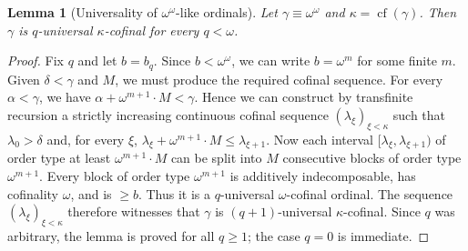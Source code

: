 \documentclass{amsart}
\newcommand{\cf}{\operatorname{cf}}
\newtheorem{lemma}{Lemma}
\theoremstyle{definition}
\begin{document}
\begin{lemma}[Universality of $\omega^\omega$-like ordinals]\label{lem:universal-large}
    Let $\gamma\equiv\omega^\omega$ and $\kappa=\cf(\gamma)$. Then $\gamma$ is $q$-universal $\kappa$-cofinal for every $q<\omega$.
\end{lemma}
\begin{proof}
    Fix $q$ and let $b=b_q$.  Since $b<\omega^\omega$, we can write $b=\omega^m$ for some finite $m$. Given $\delta<\gamma$ and $M$, we must produce the required cofinal sequence. For every $\alpha<\gamma$, we have $\alpha+\omega^{m+1}\cdot M < \gamma$. Hence we can construct by transfinite recursion a strictly increasing continuous cofinal sequence $(\lambda_\xi)_{\xi<\kappa}$ such that $\lambda_0>\delta$ and, for every $\xi$, $\lambda_\xi+\omega^{m+1}\cdot M\leq\lambda_{\xi+1}$. Now each interval $[\lambda_\xi,\lambda_{\xi+1})$ of order type at least $\omega^{m+1}\cdot M$ can be split into $M$ consecutive blocks of order type $\omega^{m+1}$.  Every block of order type $\omega^{m+1}$ is additively indecomposable, has cofinality $\omega$, and is $\ge b$. Thus it is a $q$-universal $\omega$-cofinal ordinal. The sequence $(\lambda_\xi)_{\xi<\kappa}$ therefore witnesses that $\gamma$ is $(q+1)$-universal $\kappa$-cofinal. Since $q$ was arbitrary, the lemma is proved for all $q\ge 1$; the case $q=0$ is immediate.
\end{proof}
\end{document}

